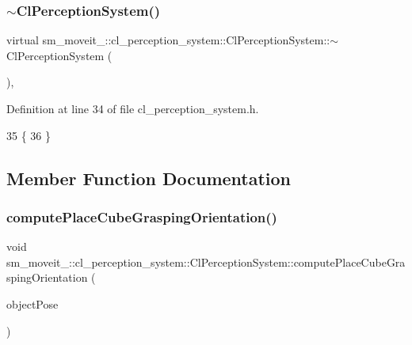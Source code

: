 \subsubsection{\texorpdfstring{$\sim$\+Cl\+Perception\+System()}{~ClPerceptionSystem()}}
{\footnotesize\ttfamily virtual sm\+\_\+moveit\+\_\+::cl\+\_\+perception\+\_\+system\+::\+Cl\+Perception\+System\+::$\sim$\+Cl\+Perception\+System (\begin{DoxyParamCaption}{ }\end{DoxyParamCaption})\hspace{0.3cm}{\ttfamily [inline]}, {\ttfamily [virtual]}}



Definition at line 34 of file cl\+\_\+perception\+\_\+system.\+h.


\begin{DoxyCode}
35             \{
36             \}
\end{DoxyCode}


\subsection{Member Function Documentation}
\mbox{\label{classsm__moveit__4_1_1cl__perception__system_1_1ClPerceptionSystem_afda35b6252c0a5c0692e3ff956609c23}} 
\subsubsection{\texorpdfstring{compute\+Place\+Cube\+Grasping\+Orientation()}{computePlaceCubeGraspingOrientation()}}
{\footnotesize\ttfamily void sm\+\_\+moveit\+\_\+::cl\+\_\+perception\+\_\+system\+::\+Cl\+Perception\+System\+::compute\+Place\+Cube\+Grasping\+Orientation (\begin{DoxyParamCaption}\item[{geometry\+\_\+msgs\+::\+Pose\+Stamped \&}]{object\+Pose }\end{DoxyParamCaption})\hspace{0.3cm}{\ttfamily [inline]}}



